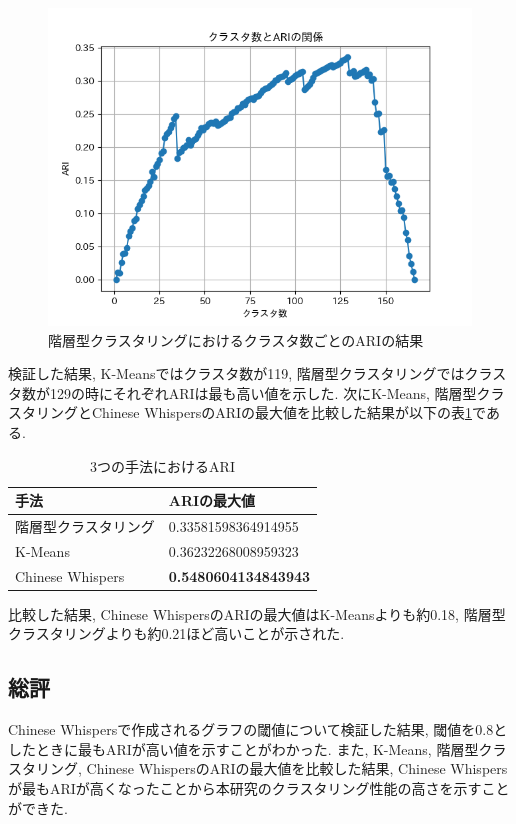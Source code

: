\begin{figure}[hbtp]
  \centering
  \includegraphics[scale=0.8]
    {contents/images/agg_graph.png}
  \caption{階層型クラスタリングにおけるクラスタ数ごとのARIの結果\label{fig:agg_graph}}
\end{figure}

検証した結果, K-Meansではクラスタ数が119, 階層型クラスタリングではクラスタ数が129の時にそれぞれARIは最も高い値を示した. 次にK-Means, 階層型クラスタリングとChinese WhispersのARIの最大値を比較した結果が以下の表\ref{tb:two_ari}である. 

\begin{table}[htbp]
  \caption{3つの手法におけるARI}
  \label{tb:two_ari}
  \begin{center}
  \begin{tabularx}{\linewidth}{|X|X|}
    \hline
    手法&ARIの最大値\\\hline\hline
    階層型クラスタリング&0.33581598364914955\\\hline
    K-Means&0.36232268008959323\\\hline
    Chinese Whispers&\textbf{0.5480604134843943}\\\hline
  \end{tabularx}\end{center}
\end{table}

比較した結果, Chinese WhispersのARIの最大値はK-Meansよりも約0.18, 階層型クラスタリングよりも約0.21ほど高いことが示された. 

\subsection{総評}
Chinese Whispersで作成されるグラフの閾値について検証した結果, 閾値を0.8としたときに最もARIが高い値を示すことがわかった. 
また, K-Means, 階層型クラスタリング, Chinese WhispersのARIの最大値を比較した結果, Chinese Whispersが最もARIが高くなったことから本研究のクラスタリング性能の高さを示すことができた. 

